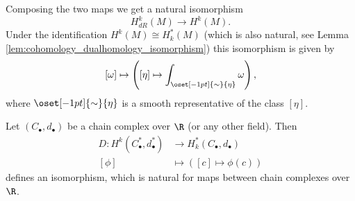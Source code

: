         Composing the two maps we get a natural isomorphism
        \[
        H_{dR}^k(M) \to H^k(M).
        \]
        Under the identification $H^k(M) \cong H_k^\ast(M)$ (which is also natural, see Lemma \ref{lem:cohomology_dualhomology_isomorphism}) this isomorphism is given by
        \[
        [\omega] \mapsto \left( [\eta] \mapsto \int_{\oset[-1pt]{\sim}{\eta}} \omega \right),
        \]
        where $\oset[-1pt]{\sim}{\eta}$ is a smooth representative of the class $[\eta]$.
        
        \begin{lemma}
            \label{lem:cohomology_dualhomology_isomorphism}
            Let $(C_\bullet,d_\bullet)$ be a chain complex over $\R$ (or any other field). Then 
            \begin{align*}
                D \colon H^k(C_\bullet^\ast,d_\bullet^\ast) &\to H_k^\ast(C_\bullet,d_\bullet) \\
                [\phi] &\mapsto \left( [c] \mapsto \phi(c)\right)
            \end{align*}
            defines an isomorphism, which is natural for maps between chain complexes over $\R$.
        \end{lemma}

